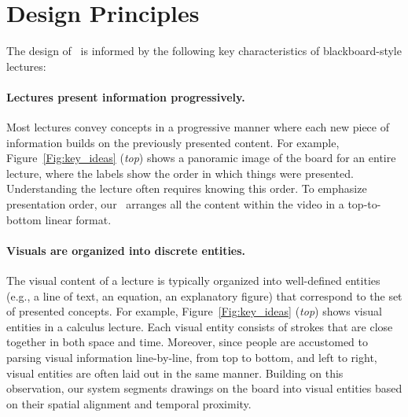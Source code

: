 \section{Design Principles}
\label{sec:principles}
%
The design of \systemname\ is informed by the following key characteristics of blackboard-style lectures:
%
\paragraph{Lectures present information progressively.}
Most lectures convey concepts in a progressive manner where each new piece of information builds on the previously presented content.
For example, Figure~\ref{Fig:key_ideas} (\textit{top}) shows a panoramic image of the board for an entire lecture, where the labels show the order in which things were presented. Understanding the lecture often requires knowing this order.
%
To emphasize presentation order, our \systemname\ arranges all the content within the video in a top-to-bottom linear format.
%
\paragraph{Visuals are organized into discrete entities.} The visual content of a lecture is typically organized into well-defined entities (e.g., a line of text, an equation, an explanatory figure) that correspond to the set of presented concepts. 
%
For example, Figure~\ref{Fig:key_ideas} (\textit{top}) shows visual entities in a calculus lecture.   Each visual entity consists of strokes that are close together in both space and time. Moreover, since people are accustomed to parsing visual information line-by-line, from top to bottom, and left to right, visual entities are often laid out in the same manner. 
%
Building on this observation, our system segments drawings on the board into visual entities based on their spatial alignment and temporal proximity.
%
